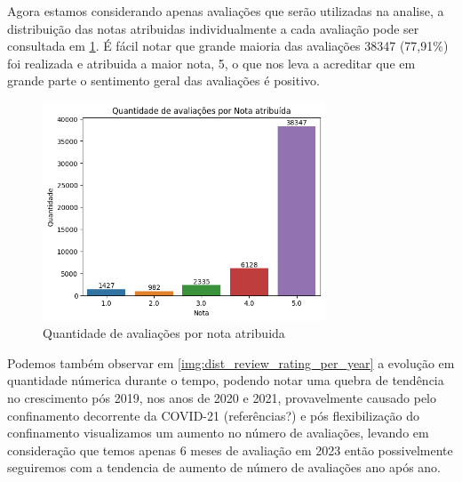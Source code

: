 Agora estamos considerando apenas avaliações que serão utilizadas na analise, a distribuição das notas atribuidas individualmente a cada avaliação pode ser consultada em \ref{img:dist_review_rating}. É fácil notar que grande maioria das avaliações 38347 (77,91\%) foi realizada e atribuida a maior nota, 5, o que nos leva a acreditar que em grande parte o sentimento geral das avaliações é positivo.

\begin{figure}
	\centering
	\includegraphics[width=0.75\textwidth]{figs/exploratoria/quantidade_avaliacao_nota_atribuida.png}
	\caption{Quantidade de avaliações por nota atribuida}
	\label{img:dist_review_rating}
\end{figure}

Podemos também observar em \ref{img:dist_review_rating_per_year} a evolução em quantidade númerica durante o tempo, podendo notar uma quebra de tendência no crescimento pós 2019, nos anos de 2020 e 2021, provavelmente causado pelo confinamento decorrente da COVID-21 (referências?) e pós flexibilização do confinamento visualizamos um aumento no número de avaliações, levando em consideração que temos apenas 6 meses de avaliação em 2023 então possivelmente seguiremos com a tendencia de aumento de número de avaliações ano após ano.

